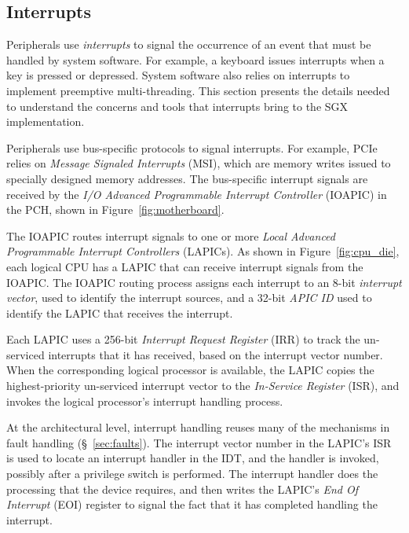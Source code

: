 \subsection{Interrupts}
\label{sec:interrupts}

Peripherals use \textit{interrupts} to signal the occurrence of an event that
must be handled by system software. For example, a keyboard issues interrupts
when a key is pressed or depressed. System software also relies on interrupts
to implement preemptive multi-threading. This section presents the details
needed to understand the concerns and tools that interrupts bring to the SGX
implementation.


Peripherals use bus-specific protocols to signal interrupts. For example, PCIe
relies on \textit{Message Signaled Interrupts} (MSI), which are memory writes
issued to specially designed memory addresses. The bus-specific interrupt
signals are received by the \textit{I/O Advanced Programmable Interrupt
Controller} (IOAPIC) in the PCH, shown in Figure~\ref{fig:motherboard}.


The IOAPIC routes interrupt signals to one or more \textit{Local Advanced
Programmable Interrupt Controllers} (LAPICs). As shown in
Figure~\ref{fig:cpu_die}, each logical CPU has a LAPIC that can receive
interrupt signals from the IOAPIC. The IOAPIC routing process assigns each
interrupt to an 8-bit \textit{interrupt vector}, used to identify the interrupt
sources, and a 32-bit \textit{APIC ID} used to identify the LAPIC that receives
the interrupt.


Each LAPIC uses a 256-bit \textit{Interrupt Request Register} (IRR) to track
the un-serviced interrupts that it has received, based on the interrupt vector
number. When the corresponding logical processor is available, the LAPIC copies
the highest-priority un-serviced interrupt vector to the
\textit{In-Service Register} (ISR), and invokes the logical processor's
interrupt handling process.


At the architectural level, interrupt handling reuses many of the mechanisms in
fault handling (\S~\ref{sec:faults}). The interrupt vector number in the
LAPIC's ISR is used to locate an interrupt handler in the IDT, and the handler
is invoked, possibly after a privilege switch is performed. The interrupt
handler does the processing that the device requires, and then writes the
LAPIC's \textit{End Of Interrupt} (EOI) register to signal the fact that it has
completed handling the interrupt.

